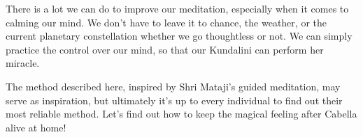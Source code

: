 \documentclass[12pt]{article}
\begin{document}

There is a lot we can do to improve our meditation, especially when it comes to calming our mind.
We don't have to leave it to chance, the weather, or the current planetary constellation whether we go thoughtless or not.
We can simply practice the control over our mind, so that our Kundalini can perform her miracle.

The method described here, inspired by Shri Mataji's guided meditation, may serve as inspiration, but ultimately it's up to every individual to find out their most reliable method.
Let's find out how to keep the magical feeling after Cabella alive at home!

\end{document}
